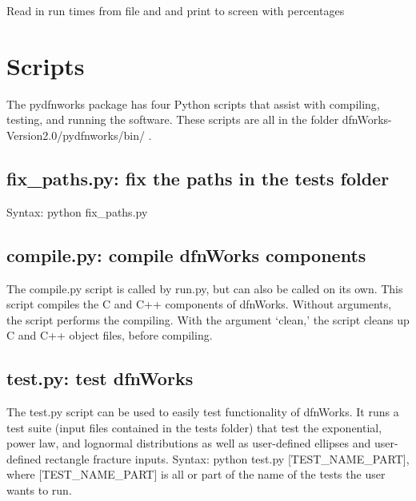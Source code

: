\documentclass[letterpaper,10pt,english]{sphinxmanual}
\begin{document}

\begin{fulllineitems}
\label{\detokenize{pydfnworks:pydfnworks.helper.print_run_time}}
Read in run times from file and and print to screen with percentages

\end{fulllineitems}



\chapter{Scripts}
\label{\detokenize{scripts:scripts}}\label{\detokenize{scripts::doc}}\label{\detokenize{scripts:scripts-chapter}}
The pydfnworks package has four Python scripts that assist with compiling, testing, and running the software. These scripts are all in the folder dfnWorks-Version2.0/pydfnworks/bin/ .


\section{fix\_paths.py: fix the paths in the tests folder}
\label{\detokenize{scripts:fix-paths-py-fix-the-paths-in-the-tests-folder}}
Syntax: python fix\_paths.py


\section{compile.py: compile dfnWorks components}
\label{\detokenize{scripts:compile-py-compile-dfnworks-components}}
The compile.py script is called by run.py, but can also be called on its own. This script compiles the C and C++ components of dfnWorks. Without arguments, the script performs the compiling. With the argument `clean,' the script cleans up C and C++ object files, before compiling.


\section{test.py: test dfnWorks}
\label{\detokenize{scripts:test-py-test-dfnworks}}
The test.py script can be used to easily test functionality of dfnWorks. It runs a test suite (input files contained in the tests folder) that test the exponential, power law, and lognormal distributions as well as user-defined ellipses and user-defined rectangle fracture inputs.
Syntax: python test.py {[}TEST\_NAME\_PART{]}, where {[}TEST\_NAME\_PART{]} is all or part of the name of the tests the user wants to run.
\end{document}
